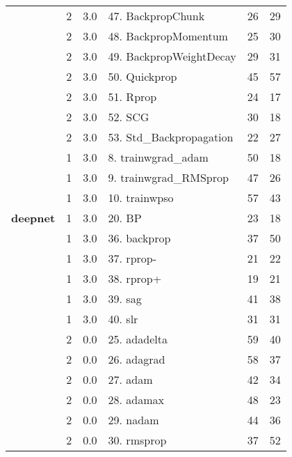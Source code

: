 \begin{Schunk}
\begin{table}
\begin{tabular}[t]{>{\bfseries}lcclcc}
 & 2 & 3.0 & 47. BackpropChunk & 26 & 29\\

 & 2 & 3.0 & 48. BackpropMomentum & 25 & 30\\

 & 2 & 3.0 & 49. BackpropWeightDecay & 29 & 31\\

 & 2 & 3.0 & 50. Quickprop & 45 & 57\\

 & 2 & 3.0 & 51. Rprop & 24 & 17\\

 & 2 & 3.0 & 52. SCG & 30 & 18\\

\multirow{-8}{*}{\raggedright\arraybackslash RSNNS} & 2 & 3.0 & 53. Std\_Backpropagation & 22 & 27\\
\cmidrule{1-6}
 & 1 & 3.0 & 8. trainwgrad\_adam & 50 & 18\\

 & 1 & 3.0 & 9. trainwgrad\_RMSprop & 47 & 26\\

\multirow{-3}{*}{\raggedright\arraybackslash automl} & 1 & 3.0 & 10. trainwpso & 57 & 43\\
\cmidrule{1-6}
deepnet & 1 & 3.0 & 20. BP & 23 & 18\\
\cmidrule{1-6}
 & 1 & 3.0 & 36. backprop & 37 & 50\\

 & 1 & 3.0 & 37. rprop- & 21 & 22\\

 & 1 & 3.0 & 38. rprop+ & 19 & 21\\

 & 1 & 3.0 & 39. sag & 41 & 38\\

\multirow{-5}{*}{\raggedright\arraybackslash neuralnet} & 1 & 3.0 & 40. slr & 31 & 31\\
\cmidrule{1-6}
 & 2 & 0.0 & 25. adadelta & 59 & 40\\

 & 2 & 0.0 & 26. adagrad & 58 & 37\\

 & 2 & 0.0 & 27. adam & 42 & 34\\

 & 2 & 0.0 & 28. adamax & 48 & 23\\

 & 2 & 0.0 & 29. nadam & 44 & 36\\

 & 2 & 0.0 & 30. rmsprop & 37 & 52\\


\end{tabular}
\end{table}
\end{Schunk}
